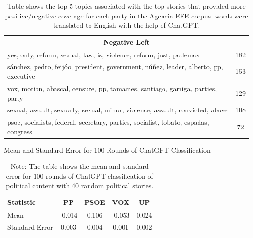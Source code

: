 \documentclass[12pt]{article}
\begin{document}
\begin{table}[!htb]
\begin{tabular}{|l|c|}
		\multicolumn{2}{|c|}{\textbf{Negative Left}} \\
		\hline
		yes, only, reform, sexual, law, is, violence, reform, just, podemos & 182 \\
		sánchez, pedro, feijóo, president, government, núñez, leader, alberto, pp, executive & 153 \\
		vox, motion, abascal, censure, pp, tamames, santiago, garriga, parties, party & 129 \\
		sexual, assault, sexually, sexual, minor, violence, assault, convicted, abuse & 108 \\
		psoe, socialists, federal, secretary, parties, socialist, lobato, espadas, congress & 72 \\
		\hline
	\end{tabular}
	\caption{Table shows the top 5 topics associated with the top stories that provided more positive/negative coverage for each party in the Agencia EFE corpus. words were translated to English with the help of ChatGPT. }
\end{table}

	
	
	
	\begin{table}[!htb]
		\centering
		\caption{Mean and Standard Error for 100 Rounds of ChatGPT Classification}
		\begin{tabular}{|l|c|c|c|c|}
			\hline
			\textbf{Statistic} & \textbf{PP} & \textbf{PSOE} & \textbf{VOX} & \textbf{UP} \\
			\hline
			Mean & -0.014 & 0.106 & -0.053 & 0.024 \\
			Standard Error & 0.003 & 0.004 & 0.001 & 0.002 \\
			\hline
		\end{tabular}
		\caption*{Note: The table shows the mean and standard error for 100 rounds of ChatGPT classification of political content with 40 random political stories.}
		\label{tab:table_stability}
	\end{table}
	
	
	
	
	
\end{document}
